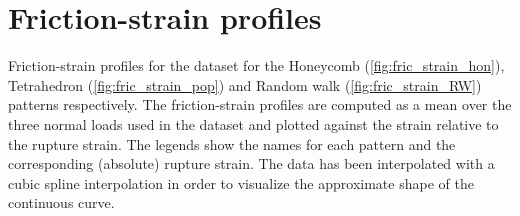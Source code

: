 \chapter{Friction-strain profiles}\label{sec:data_stretch_profiles}
Friction-strain profiles for the dataset for the Honeycomb
(\cref{fig:fric_strain_hon}), Tetrahedron (\cref{fig:fric_strain_pop}) and
Random walk (\cref{fig:fric_strain_RW}) patterns respectively. The friction-strain
profiles are computed as a mean over the three normal loads used in the dataset and plotted against
the strain relative to the rupture strain. The legends show the names for each
pattern and the corresponding (absolute) rupture strain. The data has been
interpolated with a cubic spline interpolation in order to visualize the
approximate shape of the continuous curve.


